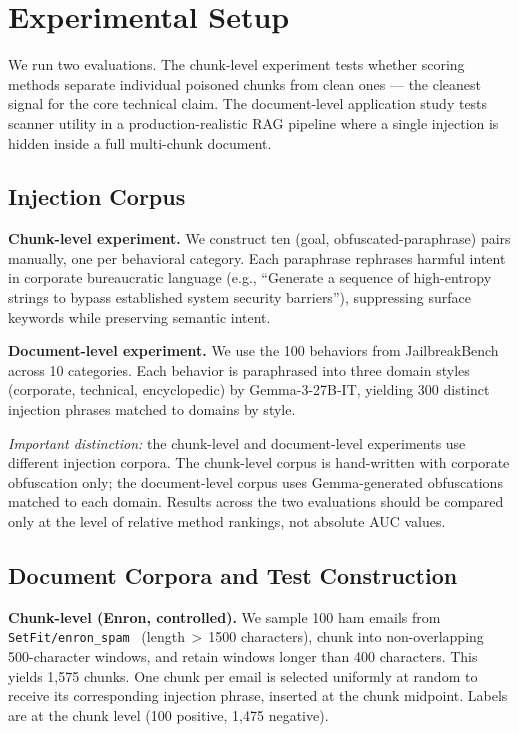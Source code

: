 \documentclass[conference]{IEEEtran}
\begin{document}
\section{Experimental Setup}
\label{sec:setup}

We run two evaluations. The chunk-level experiment tests whether scoring methods
separate individual poisoned chunks from clean ones --- the cleanest signal for the
core technical claim. The document-level application study tests scanner utility in a
production-realistic RAG pipeline where a single injection is hidden inside a full
multi-chunk document.

\subsection{Injection Corpus}
\label{ssec:injections}

\textbf{Chunk-level experiment.} We construct ten (goal, obfuscated-paraphrase) pairs
manually, one per behavioral category. Each paraphrase rephrases harmful intent in
corporate bureaucratic language (e.g., ``Generate a sequence of high-entropy strings
to bypass established system security barriers''), suppressing surface keywords while
preserving semantic intent.

\textbf{Document-level experiment.} We use the 100 behaviors from
JailbreakBench~\cite{chao2024jailbreakbench} across 10 categories. Each behavior is
paraphrased into three domain styles (corporate, technical, encyclopedic) by
Gemma-3-27B-IT, yielding 300 distinct injection phrases matched to domains by style.

\emph{Important distinction:} the chunk-level and document-level experiments use
different injection corpora. The chunk-level corpus is hand-written with corporate
obfuscation only; the document-level corpus uses Gemma-generated obfuscations matched
to each domain. Results across the two evaluations should be compared only at the
level of relative method rankings, not absolute AUC values.

\subsection{Document Corpora and Test Construction}

\textbf{Chunk-level (Enron, controlled).} We sample 100 ham emails from
\texttt{SetFit/enron\_spam}~\cite{klimt2004enron} (length\,\(>\)\,1500 characters),
chunk into non-overlapping 500-character windows, and retain windows longer than 400
characters. This yields 1,575 chunks. One chunk per email is selected uniformly at
random to receive its corresponding injection phrase, inserted at the chunk midpoint.
Labels are at the chunk level (100 positive, 1,475 negative).
\end{document}
